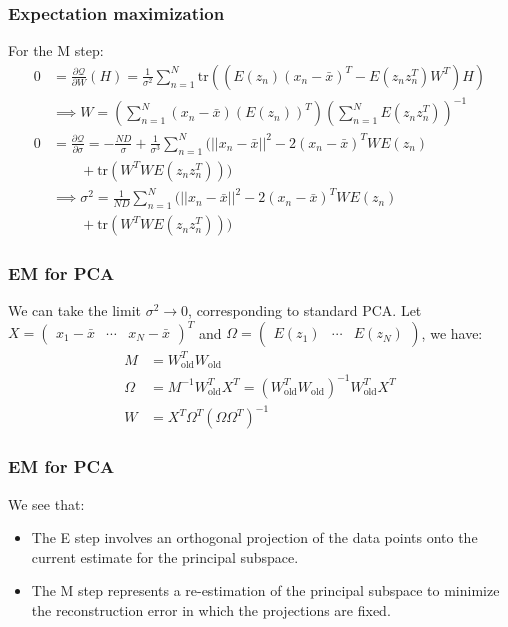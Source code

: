 \documentclass{beamer}
\begin{document}
\begin{frame}
    \frametitle{Expectation maximization}
    For the M step:
    \begin{align*}
        0&=\frac{\partial\mathcal{Q}}{\partial{}W}(H)=\frac{1}{\sigma^{2}}\sum_{n=1}^{N}\mathrm{tr}((E(z_{n})(x_{n}-\bar{x})^{T}-E(z_{n}z_{n}^{T})W^{T})H) \\
        &\implies{}W=(\sum_{n=1}^{N}(x_{n}-\bar{x})(E(z_{n}))^{T})(\sum_{n=1}^{N}E(z_{n}z_{n}^{T}))^{-1} \\
        0&=\frac{\partial\mathcal{Q}}{\partial\sigma}=-\frac{ND}{\sigma}+\frac{1}{\sigma^{3}}\sum_{n=1}^{N}(||x_{n}-\bar{x}||^{2}-2(x_{n}-\bar{x})^{T}WE(z_{n}) \\
        &\qquad+\mathrm{tr}(W^{T}WE(z_{n}z_{n}^{T}))) \\
        &\implies\sigma^{2}=\frac{1}{ND}\sum_{n=1}^{N}(||x_{n}-\bar{x}||^{2}-2(x_{n}-\bar{x})^{T}WE(z_{n}) \\
        &\qquad+\mathrm{tr}(W^{T}WE(z_{n}z_{n}^{T})))
    \end{align*}
\end{frame}

\begin{frame}
    \frametitle{EM for PCA}
    We can take the limit $\sigma^{2}\to{}0$, corresponding to standard PCA. Let $X=\begin{pmatrix}
        x_{1}-\bar{x}&\cdots&x_{N}-\bar{x}
    \end{pmatrix}^{T}$ and $\Omega=\begin{pmatrix}
        E(z_{1})&\cdots&E(z_{N})
    \end{pmatrix}$, we have:
    \begin{align*}
        M&=W^{T}_{\textrm{old}}W_{\textrm{old}} \\
        \Omega&=M^{-1}W^{T}_{\textrm{old}}X^{T}=(W^{T}_{\textrm{old}}W_{\textrm{old}})^{-1}W^{T}_{\textrm{old}}X^{T} \\
        W&=X^{T}\Omega^{T}(\Omega\Omega^{T})^{-1}
    \end{align*}
\end{frame}

\begin{frame}
    \frametitle{EM for PCA}
    We see that:
    \begin{itemize}
        \item The E step involves an orthogonal projection of the data points onto the current estimate for the principal subspace.
        \item The M step represents a re-estimation of the principal subspace to minimize the reconstruction error in which the projections are fixed.
    \end{itemize}
\end{frame}
\end{document}
